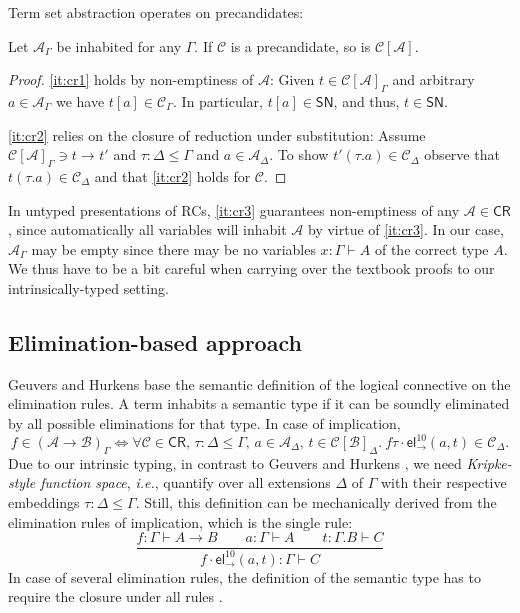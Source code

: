 \documentclass[a4paper,USenglish,cleveref, autoref, thm-restate]{lipics-v2019}
\newcommand{\ie}{\emph{i.e.}\xspace}
\newcommand{\ru}{\dfrac}
\newcommand{\tel}{\mathsf{el}}
\newcommand{\el}[2]{\ensuremath{\tel_{#1}^{#2}}}
\newcommand{\red}[1][]{\longrightarrow_{#1}}
\newcommand{\CR}{\mathsf{CR}}
\newcommand{\A}{\mathcal{A}}
\newcommand{\B}{\mathcal{B}}
\newcommand{\C}{\mathcal{C}}
\newcommand{\SN}{\mathsf{SN}}
\begin{document}
Term set abstraction operates on precandidates:
\begin{lemma}[Abstraction]
\label{lem:abs}
  Let $\A_\Gamma$ be inhabited for any $\Gamma$.
  If $\C$ is a precandidate, so is $\C[\A]$.
\end{lemma}
\begin{proof}
  \ref{it:cr1} holds by non-emptiness of $\A$:
  Given $t \in \C[\A]_\Gamma$ and
  arbitrary $a \in \A_\Gamma$ we have $t[a] \in \C_\Gamma$.  In
  particular, $t[a] \in \SN$, and thus, $t \in \SN$.

  \ref{it:cr2} relies on the closure of reduction
  under substitution:  Assume $\C[\A]_\Gamma \ni t \red t'$ and $\tau
  : \Delta \leq \Gamma$ and $a \in \A_\Delta$.  To show $t'(\tau.a)
  \in \C_\Delta$ observe that $t(\tau.a) \in \C_\Delta$ and that \ref{it:cr2}
  holds for $\C$.
\end{proof}

\begin{remark}
  In untyped presentations of RCs, \ref{it:cr3} guarantees
  non-emptiness of any $\A \in \CR$, since automatically all variables
  will inhabit $\A$ by virtue of \ref{it:cr3}.  In our case, $\A_\Gamma$
  may be empty since there may be no variables $x : \Gamma \vdash A$
  of the correct type $A$.  We thus have to be a bit careful when
  carrying over the textbook proofs
  \cite{girardLafontTaylor:proofsAndTypes}
  to our intrinsically-typed setting.
\end{remark}


\subsection{Elimination-based approach}
\label{sec:elimbased}

Geuvers and Hurkens \cite{geuversHurkens:types17} base the semantic
definition of the logical connective on the elimination rules.
A term inhabits a semantic type if it can be soundly eliminated by all
possible eliminations for that type.
In case of implication, %
\[
  f \in (\A \to \B)_\Gamma
  \iff
  \forall \C \in \CR, \,
  \tau : \Delta \leq \Gamma, \,
  a \in \A_\Delta, \,
  t \in \C[\B]_\Delta.\
  f\tau \cdot \el\to{10}(a,t) \in \C_\Delta .
\]
Due to our intrinsic typing,
in contrast to Geuvers and Hurkens \cite{geuversHurkens:types17},
we need \emph{Kripke-style function space}, \ie,
quantify over all extensions $\Delta$ of $\Gamma$ with
their respective embeddings $\tau : \Delta \leq \Gamma$.
Still, this definition can be mechanically derived from the elimination rules
of implication, which is the single rule:
\[
  \ru{f : \Gamma \vdash A \to B \qquad
      a : \Gamma \vdash A \qquad
      t : \Gamma.B \vdash C
    }{f \cdot \el\to{10}(a,t) : \Gamma \vdash C
    }
\]
In case of several elimination rules, the definition of the semantic
type has to require the closure under all rules \cite{geuversHurkens:types17}.
\end{document}

